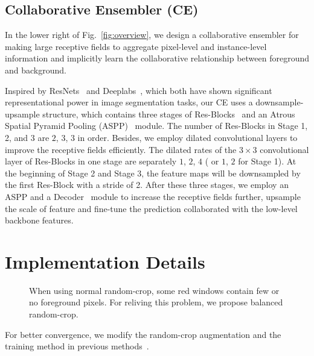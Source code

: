 \documentclass[runningheads]{llncs}
\begin{document}
\subsection{Collaborative Ensembler (CE)}

In the lower right of Fig.~\ref{fig:overview}, we design a collaborative ensembler for making large receptive fields to aggregate pixel-level and instance-level information and implicitly learn the collaborative relationship between foreground and background. 

Inspired by ResNets~\cite{resnet} and Deeplabs~\cite{deeplab,deeplabv3p}, which both have shown significant representational power in image segmentation tasks, our CE uses a downsample-upsample structure, which contains three stages of Res-Blocks~\cite{resnet} and an Atrous Spatial Pyramid Pooling (ASPP)~\cite{deeplabv3p} module. The number of Res-Blocks in Stage 1, 2, and 3 are $2$, $3$, $3$ in order. Besides, we employ dilated convolutional layers to improve the receptive fields efficiently. The dilated rates of the $3\times3$ convolutional layer of Res-Blocks in one stage are separately $1$, $2$, $4$ ( or $1$, $2$ for Stage 1). At the beginning of Stage 2 and Stage 3, the feature maps will be downsampled by the first Res-Block with a stride of 2. After these three stages, we employ an ASPP and a Decoder~\cite{deeplabv3p} module to increase the receptive fields further, upsample the scale of feature and fine-tune the prediction collaborated with the low-level backbone features.



\section{Implementation Details}
\setlength{\intextsep}{-10pt}
\begin{wrapfigure}[11]{r}{0.5\textwidth}
\center\vspace{-9mm}


\caption{When using normal random-crop, some red windows contain few or no foreground pixels. For reliving this problem, we propose balanced random-crop.}\label{fig:crop}

\end{wrapfigure}

For better convergence, we modify the random-crop augmentation and the training method in previous methods~\cite{spacetime,feelvos}.
\end{document}
